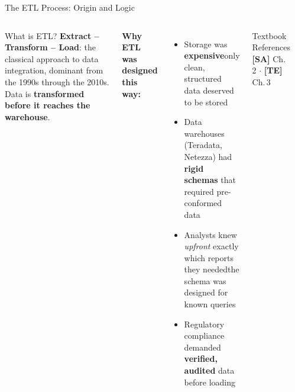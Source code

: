 \documentclass[aspectratio=169,10pt]{beamer}
\begin{document}
\begin{frame}{The ETL Process: Origin and Logic}
  \begin{columns}[T]
      \begin{block}{What is ETL?}
        \textbf{Extract -- Transform -- Load}: the classical approach to data integration, dominant from the 1990s through the 2010s.  Data is \textbf{transformed before it reaches the warehouse}.
      \end{block}
      \vspace{6pt}
      \textbf{Why ETL was designed this way:}
      \begin{itemize}
        \item Storage was \textbf{expensive}\textemdash only clean, structured data deserved to be stored
        \item Data warehouses (Teradata, Netezza) had \textbf{rigid schemas} that required pre-conformed data
        \item Analysts knew \emph{upfront} exactly which reports they needed\textemdash the schema was designed for known queries
        \item Regulatory compliance demanded \textbf{verified, audited} data before loading
      \end{itemize}
      \vspace{4pt}
      \begin{exampleblock}{Textbook References}
        \textbf{[SA]} Ch.\,2 $\cdot$ \textbf{[TE]} Ch.\,3
      \end{exampleblock}

      \begin{center}
\end{center}
\end{columns}
\end{frame}
\end{document}

